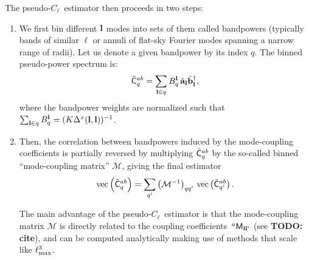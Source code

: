 \documentclass[a4paper,11pt]{article}
\newcommand{\todo}[1]{{\bf TODO: #1}}
\newcommand{\PCL}{pseudo-$C_\ell$~}
\begin{document}
    The \PCL estimator then proceeds in two steps:
    \begin{enumerate}
      \item We first bin different ${\bf l}$ modes into sets of them called bandpowers (typically bands of similar $\ell$ or annuli of flat-sky Fourier modes spanning a narrow range of radii). Let us denote a given bandpower by its index $q$. The binned pseudo-power spectrum is:
      \begin{equation}
        \tilde{\sf C}^{ab}_q=\sum_{{\bf l}\in q} B_q^{\bf l}\,\tilde{\bf a}_{\bf l}\tilde{\bf b}^\dag_{\bf l},
      \end{equation}
      where the bandpower weights are normalized such that $\sum_{{\bf l}\in q}B_q^{\bf l}=(K\Delta^x({\bf l},{\bf l}))^{-1}$.
      \item Then, the correlation between bandpowers induced by the mode-coupling coefficients is partially reversed by multiplying $\tilde{\sf C}^{ab}_q$ by the so-called binned ``mode-coupling matrix'' $\mathcal{M}$, giving the final estimator
      \begin{equation}
        {\rm vec}\left(\hat{\sf C}^{ab}_q\right) = \sum_{q'} \left(\mathcal{M}^{-1}\right)_{qq'}\,{\rm vec}\left(\tilde{\sf C}^{ab}_{q'}\right).
      \end{equation}

      The main advantage of the \PCL estimator is that the mode-coupling matrix $\mathcal{M}$ is directly related to the coupling coefficients $\,^a{\sf M}_{{\bf l}{\bf l}'}$ (see \todo{cite}), and can be computed analytically making use of methods that scale like $\ell_{\rm max}^3$.
    \end{enumerate}
    
\end{document}
